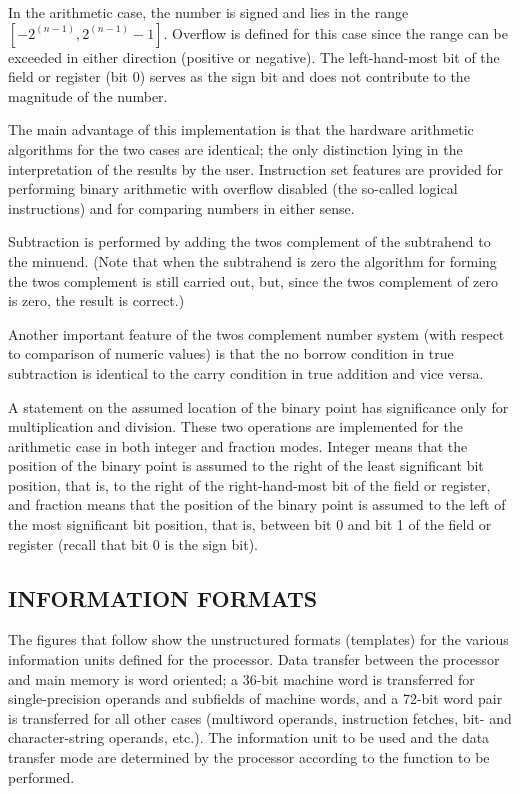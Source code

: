 In the arithmetic case, the number is signed and lies in the range
$[-2^{(n-1)},2^{(n-1)}-1]$. Overflow is defined for this case since the range
can be
exceeded in either direction (positive or negative).  The left-hand-most bit of
the field or register (bit 0) serves as the sign bit and does not contribute to
the magnitude of the number.

The main advantage of this implementation is that the hardware arithmetic
algorithms for the two cases are identical; the only distinction lying in the
interpretation of the results by the user. Instruction set features are
provided for performing binary arithmetic with overflow disabled (the so-called
logical instructions) and for comparing numbers in either sense.

Subtraction is performed by adding the twos complement of the subtrahend to the
minuend.  (Note that when the subtrahend is zero the algorithm for forming the
twos complement is still carried out, but, since the twos complement of zero is
zero, the result is correct.)

Another important feature of the twos complement number system (with respect to
comparison of numeric values) is that the no borrow condition in true
subtraction is identical to the carry condition in true addition and vice
versa.

A statement on the assumed location of the binary point has significance only
for multiplication and division. These two operations are implemented for the
arithmetic case in both integer and fraction modes. Integer means that the
position of the binary point is assumed to the right of the least significant
bit position, that is, to the right of the right-hand-most bit of the field or
register, and fraction means that the position of the binary point is assumed
to the left of the most significant bit position, that is, between bit 0 and
bit 1 of the field or register (recall that bit 0 is the sign bit).


\subsection {INFORMATION FORMATS}

The figures that follow show the unstructured formats (templates) for the
various information units defined for the processor. Data transfer between the
processor and main memory is word oriented; a 36-bit machine word is
transferred for single-precision operands and subfields of machine words, and a
72-bit word pair is transferred for all other cases (multiword operands,
instruction fetches, bit- and character-string operands, etc.). The information
unit to be used and the data transfer mode are determined by the processor
according to the function to be performed.

